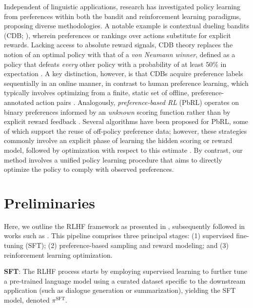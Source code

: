 Independent of linguistic applications, research has investigated policy learning from preferences within both the bandit and reinforcement learning paradigms, proposing diverse methodologies. A notable example is contextual dueling bandits (CDB; \cite{yue2012karmed,dudik2015contextual}), wherein preferences or rankings over actions substitute for explicit rewards. Lacking access to absolute reward signals, CDB theory replaces the notion of an optimal policy with that of a \textit{von Neumann winner}, defined as a policy that defeats \textit{every} other policy with a probability of at least 50\% in expectation \citep{dudik2015contextual}. A key distinction, however, is that CDBs acquire preference labels sequentially in an online manner, in contrast to human preference learning, which typically involves optimizing from a finite, static set of offline, preference-annotated action pairs \citep{yan2022human}. Analogously, \textit{preference-based RL} (PbRL) operates on binary preferences informed by an \textit{unknown} scoring function rather than by explicit reward feedback \citep{BusaFekete2014,ruiz2023dueling}. Several algorithms have been proposed for PbRL, some of which support the reuse of off-policy preference data; however, these strategies commonly involve an explicit phase of learning the hidden scoring or reward model, followed by optimization with respect to this estimate \citep{jain2013learning,BusaFekete2014,christiano2017deep,sadigh2017active,kupcsik2018learning}. By contrast, our method involves a unified policy learning procedure that aims to directly optimize the policy to comply with observed preferences.

\section{Preliminaries}\label{section:prelims}

Here, we outline the RLHF framework as presented in \citeauthor{ziegler2020finetuning}, subsequently followed in works such as \citep{stiennon2022learning, bai2022training, ouyang2022training}. This pipeline comprises three principal stages: (1) supervised fine-tuning (SFT); (2) preference-based sampling and reward modeling; and (3) reinforcement learning optimization.

\textbf{SFT}: The RLHF process starts by employing supervised learning to further tune a pre-trained language model using a curated dataset specific to the downstream application (such as dialogue generation or summarization), yielding the SFT model, denoted $\pi^\text{SFT}$.

